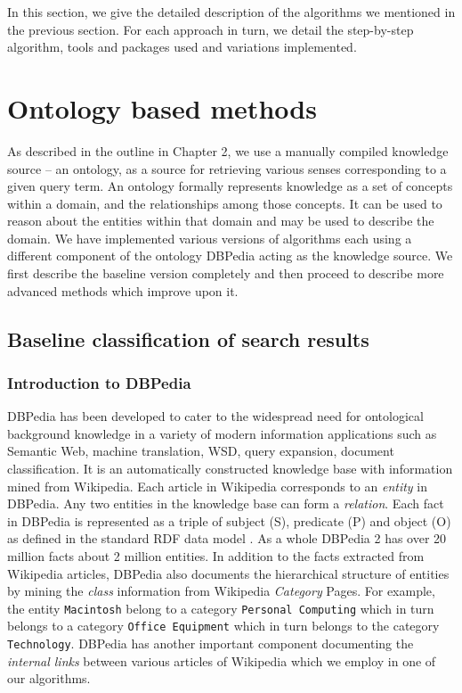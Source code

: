 \documentclass[a4paper,12pt]{report}
\begin{document}
In this section, we give the detailed description of the algorithms we
mentioned in the previous section. For each approach in turn, we
detail the step-by-step algorithm, tools and packages used and
variations implemented.

\section{Ontology based methods}
As described in the outline in Chapter 2, we use a manually compiled
knowledge source -- an ontology, as a source for retrieving various
senses corresponding to a given query term. An ontology formally
represents knowledge as a set of concepts within a domain, and the
relationships among those concepts. It can be used to reason about the
entities within that domain and may be used to describe the domain. We
have implemented various versions of algorithms each using a different
component of the ontology DBPedia\cite{dbpedia} acting as the
knowledge source. We first describe the baseline version completely and
then proceed to describe more advanced methods which improve upon it.

\subsection{Baseline classification of search results}
\subsubsection{Introduction to DBPedia}
DBPedia has been developed to cater to the widespread need for
ontological background knowledge in a variety of modern information
applications such as Semantic Web, machine translation, WSD, query
expansion, document classification. It is an automatically constructed
knowledge base with information mined from Wikipedia. Each article in
Wikipedia corresponds to an {\it entity} in DBPedia. Any two entities in
the knowledge base can form a {\it relation}. Each fact in DBPedia is
represented as a triple of subject (S), predicate (P) and object (O)
as defined in the standard RDF data model
. As a whole DBPedia 2 has over
20 million facts about 2 million entities. In addition to the facts
extracted from Wikipedia articles, DBPedia also documents the
hierarchical structure of entities by mining the {\it class}
information from Wikipedia {\it Category} Pages. For example, the
entity {\tt Macintosh} belong to a category {\tt Personal Computing}
which in turn belongs to a category {\tt Office Equipment} which in
turn belongs to the category {\tt Technology}. DBPedia has another
important component documenting the {\it internal links} between
various articles of Wikipedia which we employ in one of our algorithms.
\end{document}
